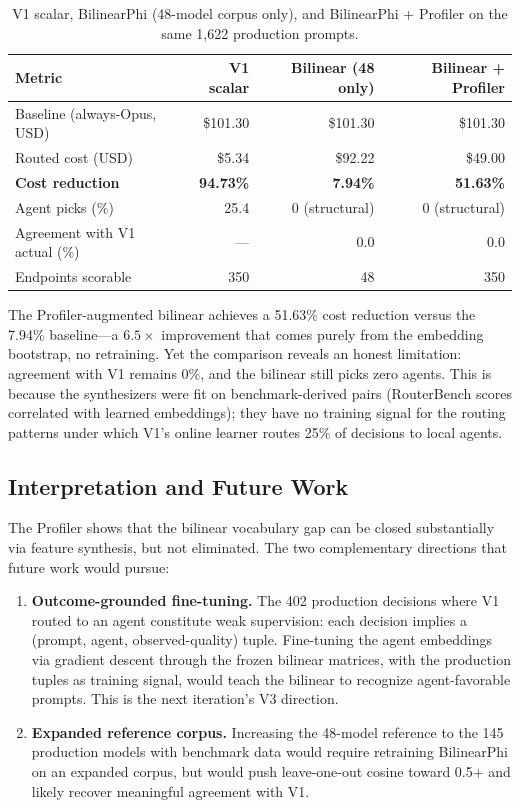 \begin{table}[h]
\centering
\caption{V1 scalar, BilinearPhi (48-model corpus only), and BilinearPhi + Profiler on the same 1{,}622 production prompts.}
\label{tab:three_views_v2}
\small
\begin{tabular}{lrrr}
\toprule
\textbf{Metric} & \textbf{V1 scalar} & \textbf{Bilinear (48 only)} & \textbf{Bilinear + Profiler} \\
\midrule
Baseline (always-Opus, USD) & \$101.30 & \$101.30 & \$101.30 \\
Routed cost (USD) & \$5.34 & \$92.22 & \$49.00 \\
\textbf{Cost reduction} & \textbf{94.73\%} & \textbf{7.94\%} & \textbf{51.63\%} \\
Agent picks (\%) & 25.4 & 0 (structural) & 0 (structural) \\
Agreement with V1 actual (\%) & --- & 0.0 & 0.0 \\
Endpoints scorable & 350 & 48 & 350 \\
\bottomrule
\end{tabular}
\end{table}

The Profiler-augmented bilinear achieves a 51.63\% cost reduction versus the 7.94\% baseline---a $6.5\times$ improvement that comes purely from the embedding bootstrap, no retraining. Yet the comparison reveals an honest limitation: agreement with V1 remains 0\%, and the bilinear still picks zero agents. This is because the synthesizers were fit on benchmark-derived pairs (RouterBench scores correlated with learned embeddings); they have no training signal for the routing patterns under which V1's online learner routes 25\% of decisions to local agents.

\subsection{Interpretation and Future Work}

The Profiler shows that the bilinear vocabulary gap can be closed substantially via feature synthesis, but not eliminated. The two complementary directions that future work would pursue:

\begin{enumerate}
    \item \textbf{Outcome-grounded fine-tuning.} The 402 production decisions where V1 routed to an agent constitute weak supervision: each decision implies a (prompt, agent, observed-quality) tuple. Fine-tuning the agent embeddings via gradient descent through the frozen bilinear matrices, with the production tuples as training signal, would teach the bilinear to recognize agent-favorable prompts. This is the next iteration's V3 direction.
    \item \textbf{Expanded reference corpus.} Increasing the 48-model reference to the 145 production models with benchmark data would require retraining BilinearPhi on an expanded corpus, but would push leave-one-out cosine toward 0.5+ and likely recover meaningful agreement with V1.
\end{enumerate}

